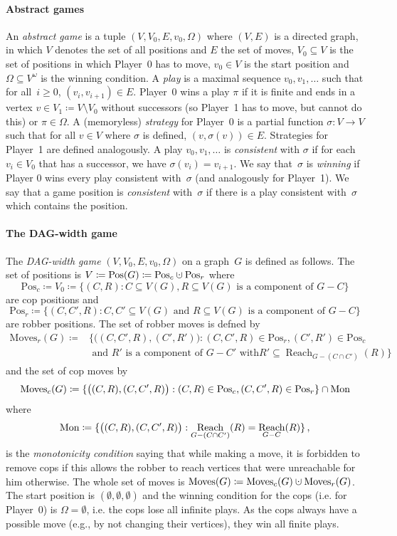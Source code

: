 \documentclass[authoryear]{article}
\makeatletter
\theoremstyle{definition}
\DeclareMathOperator{\Reach}{Reach}
\renewcommand{\mid}{\ensuremath{:}}
\newcommand{\0}{\emptyset}
\newcommand{\Pos}{\mathrm{Pos}}
\newcommand{\Moves}{\mathrm{Moves}}
\newcommand{\Mon}{\textup{Mon}}
\newcommand{\cupdot}{\mathbin{\mathaccent\cdot\cup}}
\newcommand{\dagw}{DAG-{}width\xspace}
\newcommand{\ie}{i.e.\@\xspace}
\newcommand{\eg}{e.g.,\xspace}
\makeatother
\begin{document}
\paragraph{Abstract games}An \emph{abstract game} is a tuple $(V,V_0,E,v_0,\Omega)$ where $(V,E)$ is a
directed graph, in which $V$ denotes the set of all positions and $E$
the set of moves, $V_0 \subseteq V$ is the set of positions in which
Player~0 has to move, $v_0\in V$ is the start position and $\Omega\subseteq
V^\omega$ is the winning condition. A \emph{play} is a maximal sequence $v_0, v_1, \ldots$ such that for all~$i\ge 0$, $(v_i,v_{i+1})\in
E$. Player~0 wins a play $\pi$ if it is finite and ends in a vertex
$v\in V_1\coloneqq V\setminus V_0$ without successors (so Player~1 has
to move, but cannot do this) or $\pi\in\Omega$. A (memoryless)
\emph{strategy} for Player~0 is a partial function $\sigma\colon V\to V$ such
that for all $v\in V$ where $\sigma$ is defined, $(v,\sigma(v))\in
E$. Strategies for Player~1 are defined analogously. A play $v_0,
v_1,\ldots$ is \emph{consistent} with $\sigma$ if for each $v_i\in V_0$ that
has a successor, we have $\sigma(v_i) = v_{i+1}$. We say that~$\sigma$
is \emph{winning} if Player 0 wins every play consistent with~$\sigma$
(and analogously for Player~1). We say that a game position
is \emph{consistent} with~$\sigma$ if there is a play consistent
with~$\sigma$ which contains the position.

\paragraph{The \dagw game} 
The \emph{\dagw game} $(V,V_0,E,v_0,\Omega)$ on a
graph~$G$ is defined as follows. The set of positions is $V \coloneqq \Pos(G)
\coloneqq \Pos_c \cupdot \Pos_r $ where 
\[\Pos_c \coloneqq V_0 \coloneqq  \{(C,R) \mid C\subseteq V(G),  R\subseteq V(G) 
\text{ is a component of }G- C\}\] 
are cop positions and 
\[\Pos_r \coloneqq \{(C,C',R) \mid C, C' \subseteq V(G) \text{ and }R\subseteq
V(G) \text{ is a component of }G-C\}\]
are robber positions. The set of robber moves is defned by 
\begin{align*}
\Moves_r(G) \coloneqq &\{\bigl( (C,C',R),(C',R') \bigr) \mid (C,C',R)\in \Pos_r, (C',R')\in
\Pos_c \\&\text{ and } R'\text{ is a component of } G-C' \text{ with
}R'\subseteq \Reach_{G-(C\cap C')}(R)\}
\end{align*}
and the set of cop moves by 
\[\Moves_c(G) \coloneqq \{\bigl( (C,R), (C,C',R) \bigr) \mid (C,R)\in \Pos_c,
(C,C',R)\in \Pos_r\}\cap \Mon\]
where \[\Mon \coloneqq \{\bigl((C,R),(C,C',R)\bigr)\mid
\Reach_{G-(C\cap C')}(R) = \Reach_{G-C}(R)\}\,,\]
is the \emph{monotonicity condition} saying that while making a move, it is forbidden 
to remove cops if this allows the robber to reach vertices that were unreachable for him 
otherwise. 
The whole set of moves is $\Moves(G) \coloneqq \Moves_c(G) \cupdot \Moves_r(G)$. 
The start position is $(\0,\0,\0)$ and the winning
condition for the cops (\ie for Player~0) is
$\Omega = \emptyset$, \ie the cops lose all infinite plays. 
As the cops always have a possible move (\eg by not changing their vertices), 
they win all finite plays. 
\end{document}

